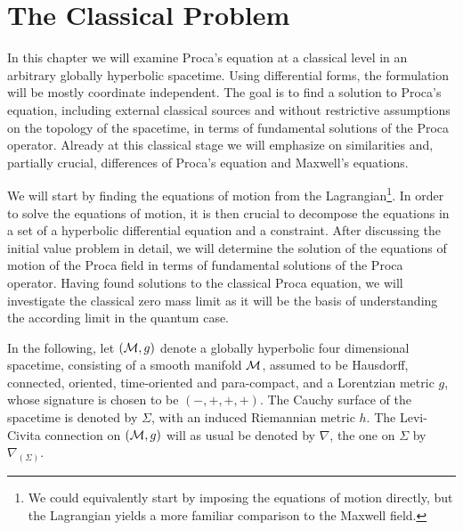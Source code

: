 \section{The Classical Problem}\label{chpt:classical}
In this chapter we will examine Proca's equation at a classical level in an arbitrary globally hyperbolic spacetime. Using differential forms, the formulation will be mostly coordinate independent. The goal is to find a solution to Proca's equation, including external classical sources and without restrictive assumptions on the topology of the spacetime, in terms of fundamental solutions of the Proca operator. Already at this classical stage we will emphasize on similarities and, partially crucial, differences of Proca's equation and Maxwell's equations.\par
We will start by finding the equations of motion from the Lagrangian\footnote{We could equivalently start by imposing the equations of motion directly, but the Lagrangian yields a more familiar comparison to the Maxwell field.}. In order to solve the equations of motion, it is then crucial to decompose the equations in a set of a hyperbolic differential equation and a constraint. After discussing the initial value problem in detail, we will determine the solution of the equations of motion of the Proca field in terms of fundamental solutions of the Proca operator.
%
Having found solutions to the classical Proca equation, we will investigate the classical zero mass limit as it will be the basis of understanding the according limit in the quantum case.\par
%
In the following, let $(\mathcal{M},g)$ denote a globally hyperbolic four dimensional spacetime, consisting of a smooth manifold $\mathcal{M}$, assumed to be Hausdorff, connected, oriented, time-oriented and para-compact,  and a Lorentzian metric $g$, whose signature is chosen to be $(-,+,+,+)$. The Cauchy surface of the spacetime is denoted by $\Sigma$, with an induced Riemannian metric $h$. The Levi-Civita connection on $(\mathcal{M},g)$ will as usual be denoted by $\nabla$, the one on $\Sigma$ by $\nabla_{(\Sigma)}$.
%
%
